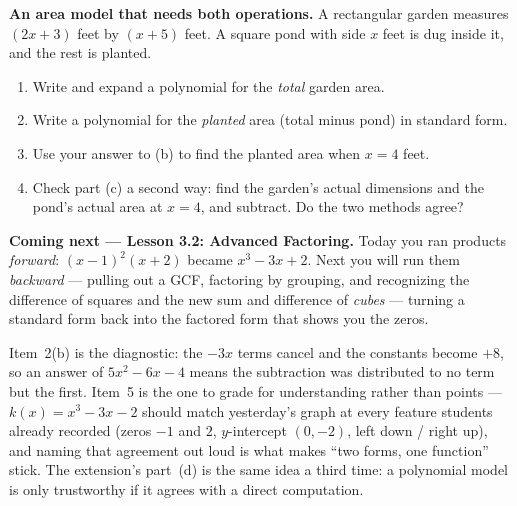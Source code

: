 \documentclass[10pt]{article}
\begin{document}
\begin{extensionbox}
\textbf{An area model that needs both operations.} A rectangular garden measures $(2x+3)$ feet by
$(x+5)$ feet. A square pond with side $x$ feet is dug inside it, and the rest is planted.
\begin{enumerate}[label=(\alph*), leftmargin=1.8em, itemsep=5pt]
  \item Write and expand a polynomial for the \emph{total} garden area.
  \item Write a polynomial for the \emph{planted} area (total minus pond) in standard form.
  \item Use your answer to (b) to find the planted area when $x = 4$ feet.
  \item Check part (c) a second way: find the garden's actual dimensions and the pond's actual area at
        $x=4$, and subtract. Do the two methods agree?
\end{enumerate}
\end{extensionbox}

\begin{spiralbox}
\textbf{Coming next --- Lesson 3.2: Advanced Factoring.} Today you ran products \emph{forward}:
$(x-1)^2(x+2)$ became $x^3-3x+2$. Next you will run them \emph{backward} --- pulling out a GCF,
factoring by grouping, and recognizing the difference of squares and the new sum and difference of
\emph{cubes} --- turning a standard form back into the factored form that shows you the zeros.
\end{spiralbox}

\begin{teachernote}
Item~2(b) is the diagnostic: the $-3x$ terms cancel and the constants become $+8$, so an answer of
$5x^2-6x-4$ means the subtraction was distributed to no term but the first. Item~5 is the one to
grade for understanding rather than points --- $k(x)=x^3-3x-2$ should match yesterday's graph at
every feature students already recorded (zeros $-1$ and $2$, $y$-intercept $(0,-2)$, left down / right
up), and naming that agreement out loud is what makes ``two forms, one function'' stick. The
extension's part~(d) is the same idea a third time: a polynomial model is only trustworthy if it
agrees with a direct computation.
\end{teachernote}
\end{document}

